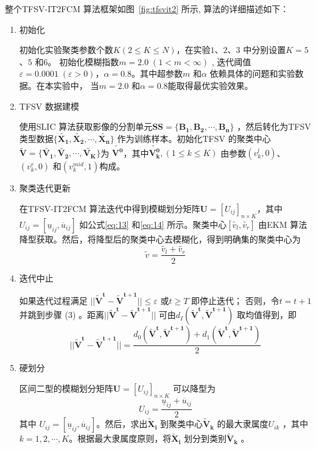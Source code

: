 整个TFSV-IT2FCM 算法框架如图~\ref{fig:tfsvit2} 所示, 算法的详细描述如下：
\begin{enumerate}[(1)]
    \item 初始化

          初始化实验聚类参数个数$K (2 \leq K \leq N)$，在实验$1$、$2$、$3$ 中分别设置$K=5$、$5$ 和$6$。 初始化模糊指数$m = 2.0 \; (1 < m < \infty)$ , 迭代阈值$\varepsilon = 0.0001 \;(\varepsilon > 0)$，$\alpha = 0.8$。其中超参数$m$ 和$\alpha$ 依赖具体的问题和实验数据。在本实验中， 当$m = 2.0$ 和$\alpha = 0.8$能取得最优实验效果。

    \item TFSV 数据建模

          使用SLIC 算法获取影像的分割单元$\bm{SS} = \lbrace \bm{B_1}, \bm{B_2},\bm{\cdots}, \bm{B_n} \rbrace$ ，然后转化为TFSV 类型数据$\lbrace \bm{\tilde{X_1}},\bm{\tilde{X_2}},\cdots, \bm{\tilde{X_n}}  \rbrace$ 作为训练样本。初始化TFSV 的聚类中心$\bm{\tilde{V}} = \lbrace \bm{\tilde{V_1}}, \bm{\tilde{V_2}}, \cdots, \bm{\tilde{V_K}} \rbrace$为 $\bm{\tilde{V^0}}$，其中$\bm{\tilde{V_k^0}},(1 \leq k \leq K)$ 由参数$(v_k^l, 0)$、$(v_k^r, 0)$ 和$(v_k^{mid}, 1)$构成。

    \item 聚类迭代更新

          在TFSV-IT2FCM 算法迭代中得到模糊划分矩阵$\bm{U} = [U_{ij}]_{n \times K}$，其中 $U_{ij} = [ \underline{u}_{ij}, \overline{u}_{ij}]$ 如公式\ref{eq:13} 和\ref{eq:14} 所示。聚类中心$[\tilde{v_l},\tilde{v_r}]$ 由EKM 算法降型获取。然后，将降型后的聚类中心去模糊化，得到明确集的聚类中心为
          \begin{equation}\label{eq:19}
              \tilde{v} = \frac{\tilde{v_l}+ \tilde{v_r}}{2}
          \end{equation}

    \item 迭代中止

          如果迭代过程满足 $||\bm{\tilde{V}^t} - \bm{\tilde{V}^{t+1}}|| \leq \varepsilon$ 或$t \geq T$ 即停止迭代； 否则，令$t = t+1$ 并跳到步骤 (3) 。距离$||\bm{\tilde{V}^t} - \bm{\tilde{V}^{t+1}}||$ 可由$d_I(\bm{\tilde{V}^t},\bm{\tilde{V}^{t+1}})$ 取均值得到，即
          \begin{equation}\label{eq:20}
              ||\bm{\tilde{V}^t} - \bm{\tilde{V}^{t+1}}|| = \frac{d_0(\bm{\tilde{V}^t}, \bm{\tilde{V}^{t+1}})+ d_1(\bm{\tilde{V}^t}, \bm{\tilde{V}^{t+1}})}{2}
          \end{equation}

    \item 硬划分

          区间二型的模糊划分矩阵$\bm{U} = [U_{ij}]_{n \times K}$ 可以降型为
          \begin{equation}\label{eq:21}
              U_{ij} = \frac{\underline{u}_{ij} + \overline{u}_{ij}}{2}
          \end{equation}
          其中 $U_{ij} = [\underline{u}_{ij}, \overline{u}_{ij}]$。然后，求出$\bm{\tilde{X}_i}$ 到聚类中心$\bm{\tilde{V}_k}$ 的最大隶属度$U_{ik}$ ，其中$k = 1, 2,\cdots, K$。根据最大隶属度原则，将$\bm{\tilde{X}_i}$ 划分到类别$\bm{\tilde{V}_k}$ 。



\end{enumerate}


